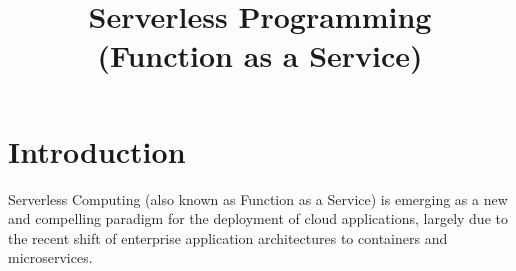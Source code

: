 \documentclass[conference]{IEEEtran}
\begin{document}
%
\title{Serverless Programming\\ \Large(Function as a Service)}



%
\author{
}


\maketitle






%
\IEEEpeerreviewmaketitle



\section{Introduction}

Serverless Computing (also known as Function as a Service) is emerging as a new and compelling paradigm for the deployment of cloud applications, largely due to the recent shift of enterprise application architectures to containers and microservices.
\end{document}
